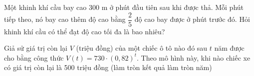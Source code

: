 \begin{bt}%

	Một khinh khí cầu bay cao $300$ m ở phút đầu tiên sau khi được thả. Mỗi phút tiếp theo, nó bay cao 
thêm độ cao bằng $\dfrac{2}{5}$ độ cao bay được ở phút trước đó. Hỏi khinh khí cầu có thể đạt độ cao tối đa là bao nhiêu?
\end{bt}

\begin{bt}%
Giả sử giá trị còn lại $V$ (triệu đồng) của một chiếc ô tô nào đó sau $t$ năm được cho bằng công thức $V(t) = 730 \cdot (0,82)^t$. Theo mô hình này, khi nào chiếc xe có giá trị còn lại là 500 triệu đồng (làm tròn kết quả làm tròn năm)\\
\end{bt}

